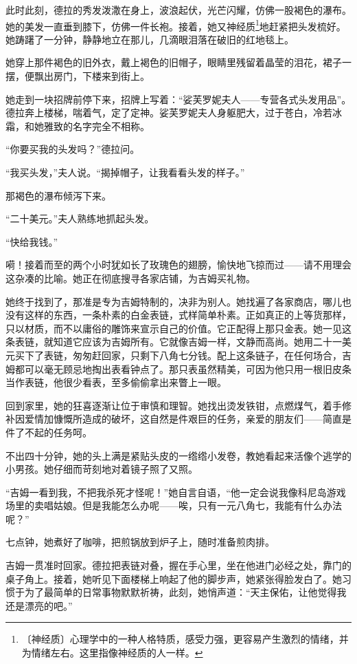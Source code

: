 \documentclass[12pt,UTF-8,openany]{ctexbook}
\begin{document}
\begin{normalsize}
    此时此刻，德拉的秀发泼潵在身上，波浪起伏，光芒闪耀，仿佛一股褐色的瀑布。她的美发一直垂到膝下，仿佛一件长袍。接着，她又神经质\footnote{〔神经质〕心理学中的一种人格特质，感受力强，更容易产生激烈的情绪，并为情绪左右。这里指像神经质的人一样。}地赶紧把头发梳好。她踌躇了一分钟，静静地立在那儿，几滴眼泪落在破旧的红地毯上。
    
    她穿上那件褐色的旧外衣，戴上褐色的旧帽子，眼睛里残留着晶莹的泪花，裙子一摆，便飘出房门，下楼来到街上。
    
    她走到一块招牌前停下来，招牌上写着：“娑芙罗妮夫人——专营各式头发用品”。德拉奔上楼梯，喘着气，定了定神。娑芙罗妮夫人身躯肥大，过于苍白，冷若冰霜，和她雅致的名字完全不相称。
    
    “你要买我的头发吗？”德拉问。
    
    “我买头发，”夫人说。“揭掉帽子，让我看看头发的样子。”
    
    那褐色的瀑布倾泻下来。
    
    “二十美元。”夫人熟练地抓起头发。
    
    “快给我钱。”
    
    嗬！接着而至的两个小时犹如长了玫瑰色的翅膀，愉快地飞掠而过——请不用理会这杂凑的比喻。她正在彻底搜寻各家店铺，为吉姆买礼物。
    
    她终于找到了，那准是专为吉姆特制的，决非为别人。她找遍了各家商店，哪儿也没有这样的东西，一条朴素的白金表链，式样简单朴素。正如真正的上等货那样，只以材质，而不以庸俗的雕饰来宣示自己的价值。它正配得上那只金表。她一见这条表链，就知道它应该为吉姆所有。它就像吉姆一样，文静而高尚。她用二十一美元买下了表链，匆匆赶回家，只剩下八角七分钱。配上这条链子，在任何场合，吉姆都可以毫无顾忌地掏出表看钟点了。那只表虽然精美，可因为他只用一根旧皮条当作表链，他很少看表，至多偷偷拿出来瞥上一眼。
    
    回到家里，她的狂喜逐渐让位于审慎和理智。她找出烫发铁钳，点燃煤气，着手修补因爱情加慷慨所造成的破坏，这自然是件艰巨的任务，亲爱的朋友们——简直是件了不起的任务呵。
    
    不出四十分钟，她的头上满是紧贴头皮的一绺绺小发卷，教她看起来活像个逃学的小男孩。她仔细而苛刻地对着镜子照了又照。
    
    “吉姆一看到我，不把我杀死才怪呢！”她自言自语，“他一定会说我像科尼岛游戏场里的卖唱姑娘。但是我能怎么办呢——唉，只有一元八角七，我能有什么办法呢？”
    
    七点钟，她煮好了咖啡，把煎锅放到炉子上，随时准备煎肉排。
    
    吉姆一贯准时回家。德拉把表链对叠，握在手心里，坐在他进门必经之处，靠门的桌子角上。接着，她听见下面楼梯上响起了他的脚步声，她紧张得脸发白了。她习惯于为了最简单的日常事物默默祈祷，此刻，她悄声道：“天主保佑，让他觉得我还是漂亮的吧。”
    

\end{normalsize}
\end{document}

